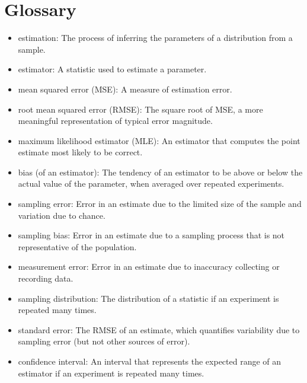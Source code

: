 \documentclass[12pt]{book}
\begin{document}
\section{Glossary}

\begin{itemize}

\item estimation: The process of inferring the parameters of a distribution
from a sample.

\item estimator: A statistic used to estimate a parameter.

\item mean squared error (MSE): A measure of estimation error.

\item root mean squared error (RMSE): The square root of MSE,
a more meaningful representation of typical error magnitude.

\item maximum likelihood estimator (MLE): An estimator that computes the
point estimate most likely to be correct.

\item bias (of an estimator): The tendency of an estimator to be above or
  below the actual value of the parameter, when averaged over repeated
  experiments.  

\item sampling error: Error in an estimate due to the limited
  size of the sample and variation due to chance. 

\item sampling bias: Error in an estimate due to a sampling process
  that is not representative of the population. 

\item measurement error: Error in an estimate due to inaccuracy collecting
  or recording data. 

\item sampling distribution: The distribution of a statistic if an
  experiment is repeated many times.  

\item standard error: The RMSE of an estimate,
which quantifies variability due to sampling error (but not
other sources of error).

\item confidence interval: An interval that represents the expected
  range of an estimator if an experiment is repeated many times.
   

\end{itemize}
\end{document}
